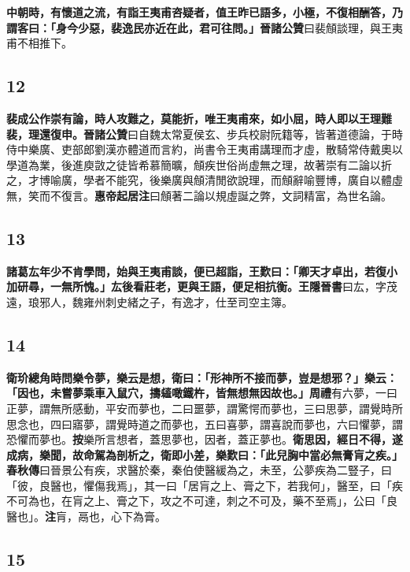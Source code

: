 \textbf{中朝時，有懷道之流，有詣王夷甫咨疑者，值王昨已語多，小極，不復相酬答，乃謂客曰：「身今少惡，裴逸民亦近在此，君可往問。」}{\footnotesize \textbf{晉諸公贊}曰裴頠談理，與王夷甫不相推下。}

\subsection*{12}

\textbf{裴成公作崇有論，時人攻難之，莫能折，唯王夷甫來，如小屈，時人即以王理難裴，理還復申。}{\footnotesize \textbf{晉諸公贊}曰自魏太常夏侯玄、步兵校尉阮籍等，皆著道德論，于時侍中樂廣、吏部郎劉漢亦體道而言約，尚書令王夷甫講理而才虛，散騎常侍戴奧以學道為業，後進庾敳之徒皆希慕簡曠，頠疾世俗尚虛無之理，故著崇有二論以折之，才博喻廣，學者不能究，後樂廣與頠清閒欲說理，而頠辭喻豐博，廣自以體虛無，笑而不復言。\textbf{惠帝起居注}曰頠著二論以規虛誕之弊，文詞精富，為世名論。}

\subsection*{13}

\textbf{諸葛厷年少不肯學問，始與王夷甫談，便已超詣，王歎曰：「卿天才卓出，若復小加研尋，一無所愧。」厷後看莊老，更與王語，便足相抗衡。}{\footnotesize \textbf{王隱晉書}曰厷，字茂遠，琅邪人，魏雍州刺史緒之子，有逸才，仕至司空主簿。}

\subsection*{14}

\textbf{衛玠總角時問樂令夢，樂云是想，衛曰：「形神所不接而夢，豈是想邪？」樂云：「因也，未嘗夢乘車入鼠穴，擣䪢噉鐵杵，皆無想無因故也。」}{\footnotesize \textbf{周禮}有六夢，一曰正夢，謂無所感動，平安而夢也，二曰噩夢，謂驚愕而夢也，三曰思夢，謂覺時所思念也，四曰寤夢，謂覺時道之而夢也，五曰喜夢，謂喜說而夢也，六曰懼夢，謂恐懼而夢也。\textbf{按}樂所言想者，蓋思夢也，因者，蓋正夢也。}\textbf{衛思因，經日不得，遂成病，樂聞，故命駕為剖析之，衛即小差，樂歎曰：「此兒胸中當必無膏肓之疾。」}{\footnotesize \textbf{春秋傳}曰晉景公有疾，求醫於秦，秦伯使醫緩為之，未至，公夢疾為二豎子，曰「彼，良醫也，懼傷我焉」，其一曰「居肓之上、膏之下，若我何」，醫至，曰「疾不可為也，在肓之上、膏之下，攻之不可達，刺之不可及，藥不至焉」，公曰「良醫也」。\textbf{注}肓，鬲也，心下為膏。}

\subsection*{15}

